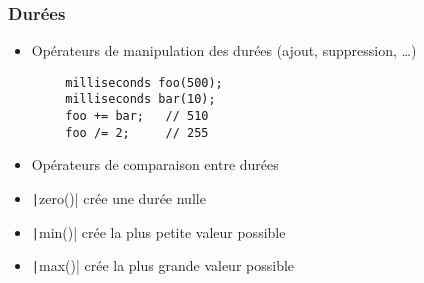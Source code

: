 \documentclass[C++.tex]{subfiles}
\begin{document}
\begin{frame}[fragile]
	\frametitle{Durées}
	\begin{itemize}
		\item Opérateurs de manipulation des durées (ajout, suppression, \ldots{})
	\end{itemize}

	\begin{verbatim}
		milliseconds foo(500);
		milliseconds bar(10);
		foo += bar;   // 510
		foo /= 2;     // 255
	\end{verbatim}

	\begin{itemize}
		\item Opérateurs de comparaison entre durées
		\item \texttt|zero()| crée une durée nulle
		\item \texttt|min()| crée la plus petite valeur possible
		\item \texttt|max()| crée la plus grande valeur possible
	\end{itemize}

\end{frame}
\end{document}
